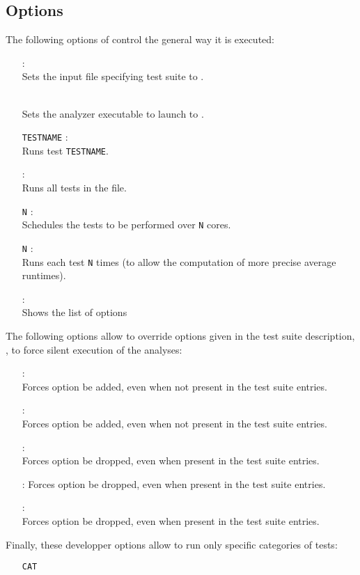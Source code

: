 \subsection{Options}
The following options of \sbatch control the general way it is
executed:
\begin{itemize}
\item[\soption{-in-file} \sfile{file.txt}]: \\
  Sets the input file specifying test suite to .
\item[\soption{-analyzer} \sfile{analyzer}] \optadv \\
  Sets the analyzer executable to launch to .
\item[\texttt{TESTNAME}]: \\
  Runs test \texttt{TESTNAME}.
\item[\soption{-all-test}]: \\
  Runs all tests in the file.
\item[\soption{-ncores} \texttt{N}]: \\
  Schedules the tests to be performed over \texttt{N} cores.
\item[\soption{-stress-test} \texttt{N}]: \\
  Runs each test \texttt{N} times (to allow the computation of more
  precise average runtimes).
\item[\soption{-help}]: \\
  Shows the list of options
\end{itemize}
The following options allow to override options given in the test
suite description, \eg, to force silent execution of the analyses:
\begin{itemize}
\item[\soption{-silent}]: \\
  Forces option  be added, even when not present in
  the test suite entries.
\item[\soption{-very-silent}]: \\
  Forces option  be added, even when not present in
  the test suite entries.
\item[\soption{-no-silent}]: \\
  Forces option  be dropped, even when present in
  the test suite entries.
\item[\soption{-no-very-silent}]:
  Forces option  be dropped, even when present in
  the test suite entries.
\item[\soption{-no-timing}]: \\
  Forces option  be dropped, even when present in
  the test suite entries.
\end{itemize}
Finally, these developper options allow to run only specific categories
of tests:
\begin{itemize}
\item[\soption{-pure-regtest}] \optdev
\item[\soption{-pure-expe}] \optdev
\item[\soption{-pure-cat} \texttt{CAT}] \optdev
\end{itemize}

